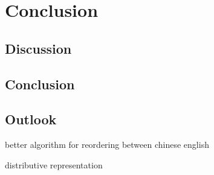 

\chapter{Conclusion}
\label{ch:Conclusion}

\section{Discussion}
\label{ch:Conclusion:sec:Discussion}


\section{Conclusion}
\label{ch:Conclusion:sec:Conclusion}


\section{Outlook}
\label{ch:Conclusion:sec:Outlook}

better algorithm for reordering between chinese english

distributive representation